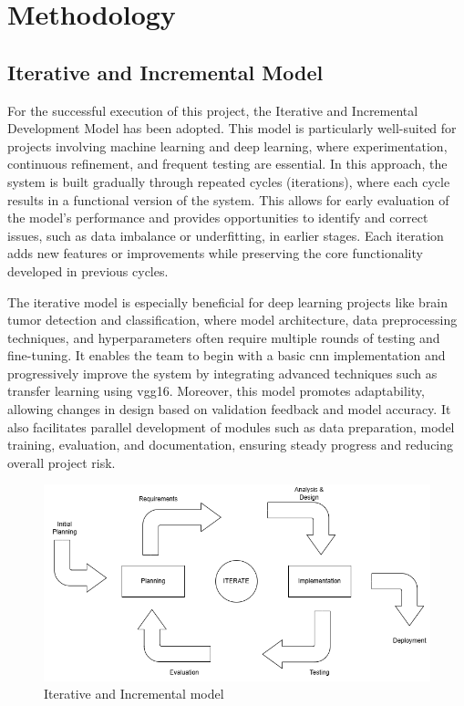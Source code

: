 \section{Methodology}
\subsection{Iterative and Incremental Model}

For the successful execution of this project, the Iterative and Incremental Development Model has been adopted. This model is particularly well-suited for projects involving machine learning and deep learning, where experimentation, continuous refinement, and frequent testing are essential. In this approach, the system is built gradually through repeated cycles (iterations), where each cycle results in a functional version of the system. This allows for early evaluation of the model's performance and provides opportunities to identify and correct issues, such as data imbalance or underfitting, in earlier stages. Each iteration adds new features or improvements while preserving the core functionality developed in previous cycles.

The iterative model is especially beneficial for deep learning projects like brain tumor detection and classification, where model architecture, data preprocessing techniques, and hyperparameters often require multiple rounds of testing and fine-tuning. It enables the team to begin with a basic \gls{cnn} implementation and progressively improve the system by integrating advanced techniques such as transfer learning using \gls{vgg16}. Moreover, this model promotes adaptability, allowing changes in design based on validation feedback and model accuracy. It also facilitates parallel development of modules such as data preparation, model training, evaluation, and documentation, ensuring steady progress and reducing overall project risk.
\begin{figure}[h]
    \centering
    \includegraphics[width=1\linewidth]{Images/model.png}
    \caption{Iterative and Incremental model}
    \label{fig:enter-label}
\end{figure}

